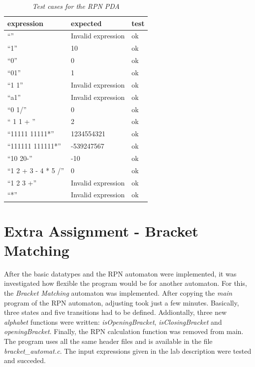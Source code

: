 \documentclass[a4paper,11pt,twoside]{article}
\begin{document}
\begin{table}[]
\centering
\caption{\textit{Test cases for the RPN PDA}}
\label{tab:test}
\begin{tabular}{lll}
expression          & expected           & test \\ \hline
``''                  & Invalid expression & ok   \\
``1''                 & 10                 & ok   \\
``0''                 & 0                  & ok   \\
``01''                & 1                  & ok   \\
``1 1''               & Invalid expression & ok   \\
``a1''                & Invalid expression & ok   \\
``0 1/''              & 0                  & ok   \\
``   1 1  +  ''       & 2                  & ok   \\
``11111 11111*''      & 1234554321         & ok   \\
``111111 111111*''    & -539247567         & ok   \\
``10 20-''            & -10                & ok   \\
``1 2 + 3 - 4 * 5 /'' & 0                  & ok   \\
``1 2 3 +''           & Invalid expression & ok   \\
``*''                 & Invalid expression & ok  
\end{tabular}
\end{table}

\section{Extra Assignment - Bracket Matching}
After the basic datatypes and the RPN automaton were implemented, it
was investigated how flexible the program would be for another
automaton. For this, the \textit{Bracket Matching} automaton was
implemented. After copying the \textit{main} program of the RPN
automaton, adjusting took just a few minutes. Basically, three states
and five transitions had to be defined.  Addiontally, three new
\textit{alphabet} functions were written: \textit{isOpeningBracket},
\textit{isClosingBracket} and \textit{openingBracket}. Finally, the
RPN calculation function was removed from main. The program uses all
the same header files and is available in the file
\textit{bracket\_automat.c}. The input expressions given in the
lab description were tested and succeded.
\end{document}
